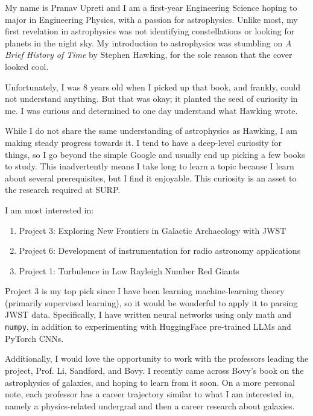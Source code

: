 \documentclass[12pt]{article}
\begin{document}
\pagestyle{fancy}

My name is Pranav Upreti and I am a first-year Engineering Science hoping to major in Engineering Physics, with a passion for astrophysics. Unlike most, my first revelation in astrophysics was not identifying constellations or looking for planets in the night sky. My introduction to astrophysics was stumbling on \textit{A Brief History of Time} by Stephen Hawking, for the sole reason that the cover looked cool. 

Unfortunately, I was 8 years old when I picked up that book, and frankly, could not understand anything. But that was okay; it planted the seed of curiosity in me. I was curious and determined to one day understand what Hawking wrote. 

While I do not share the same understanding of astrophysics as Hawking, I am making steady progress towards it. I tend to have a deep-level curiosity for things, so I go beyond the simple Google and usually end up picking a few books to study. This inadvertently means I take long to learn a topic because I learn about several prerequisites, but I find it enjoyable. This curiosity is an asset to the research required at SURP.

I am most interested in:
\begin{enumerate}
    \item Project 3: Exploring New Frontiers in Galactic Archaeology with JWST
    \item Project 6: Development of instrumentation for radio astronomy applications
    \item Project 1: Turbulence in Low Rayleigh Number Red Giants
\end{enumerate}

Project 3 is my top pick since I have been learning machine-learning theory (primarily supervised learning), so it would be wonderful to apply it to parsing JWST data. Specifically, I have written neural networks using only math and \texttt{numpy}, in addition to experimenting with HuggingFace pre-trained LLMs and PyTorch CNNs. 

Additionally, I would love the opportunity to work with the professors leading the project, Prof. Li, Sandford, and Bovy. I recently came across Bovy's book on the astrophysics of galaxies, and hoping to learn from it soon.  On a more personal note, each professor has a career trajectory similar to what I am interested in, namely a physics-related undergrad and then a career research about galaxies.
\end{document}
